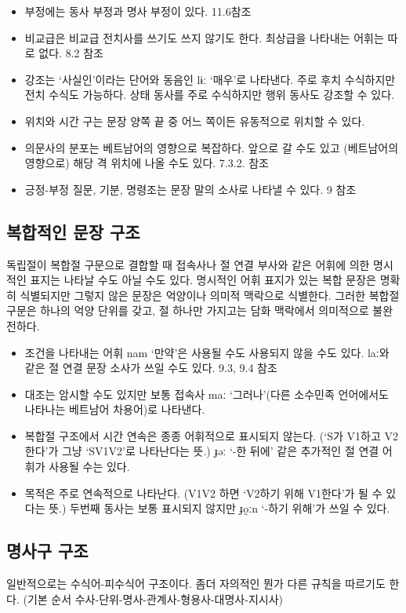 \begin{itemize}
\item 부정에는 동사 부정과 명사 부정이 있다. 11.6참조
\item 비교급은 비교급 전치사를 쓰기도 쓰지 않기도 한다. 최상급을 나타내는 어휘는 따로 없다. 8.2 참조
\item 강조는 `사실인'이라는 단어와 동음인 lɨː `매우'로 나타낸다. 주로 후치 수식하지만 전치 수식도 가능하다. 상태 동사를 주로 수식하지만 행위 동사도 강조할 수 있다.
\item 위치와 시간 구는 문장 양쪽 끝 중 어느 쪽이든 유동적으로 위치할 수 있다.
\item 의문사의 분포는 베트남어의 영향으로 복잡하다. 앞으로 갈 수도 있고 (베트남어의 영향으로) 해당 격 위치에 나올 수도 있다. 7.3.2. 참조
\item 긍정-부정 질문, 기분, 명령조는 문장 말의 소사로 나타낼 수 있다. 9 참조
\end{itemize}

\subsection{복합적인 문장 구조}
독립절이 복합절 구문으로 결합할 때 접속사나 절 연결 부사와 같은 어휘에 의한 명시적인 표지는 나타날 수도 아닐 수도 있다. 명시적인 어휘 표지가 있는 복합 문장은 명확히 식별되지만 그렇지 않은 문장은 억양이나 의미적 맥락으로 식별한다. 그러한 복합절 구문은 하나의 억양 단위를 갖고, 절 하나만 가지고는 담화 맥락에서 의미적으로 불완전하다.

\begin{itemize}
\item 조건을 나타내는 어휘 nam `만약'은 사용될 수도 사용되지 않을 수도 있다. laː와 같은 절 연결 문장 소사가 쓰일 수도 있다. 9.3, 9.4 참조
\item 대조는 암시할 수도 있지만 보통 접속사 maː `그러나'(다른 소수민족 언어에서도 나타나는 베트남어 차용어)로 나타낸다.
\item 복합절 구조에서 시간 연속은 종종 어휘적으로 표시되지 않는다. (`S가 V1하고 V2한다'가 그냥 `SV1V2'로 나타난다는 뜻.) ɟəː `-한 뒤에' 같은 추가적인 절 연결 어휘가 사용될 수는 있다.
\item 목적은 주로 연속적으로 나타난다. (V1V2 하면 `V2하기 위해 V1한다'가 될 수 있다는 뜻.) 두번째 동사는 보통 표시되지 않지만 ɟo̰ːn `-하기 위해'가 쓰일 수 있다.
\end {itemize}

\subsection{명사구 구조}
일반적으로는 수식어-피수식어 구조이다. 좀더 자의적인 뭔가 다른 규칙을 따르기도 한다.
(기본 순서 수사-단위-명사-관계사-형용사-대명사-지시사)

